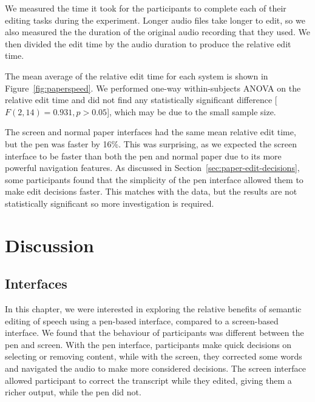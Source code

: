 We measured the time it took for the participants to complete each of their editing tasks during the experiment.
Longer audio files take longer to edit, so we also measured the the duration of the original audio recording that they
used. We then divided the edit time by the audio duration to produce the relative edit time.


The mean average of the relative edit time for each system is shown in Figure~\ref{fig:paperspeed}. We performed
one-way within-subjects ANOVA on the relative edit time and did not find any statistically significant difference
[$F(2,14) = 0.931, p > 0.05$], which may be due to the small sample size.

The screen and normal paper interfaces had the same mean relative edit time, but the pen was faster by 16\%.  This was
surprising, as we expected the screen interface to be faster than both the pen and normal paper due to its more
powerful navigation features. As discussed in Section~\ref{sec:paper-edit-decisions}, some participants found that the
simplicity of the pen interface allowed them to make edit decisions faster. This matches with the data, but the results
are not statistically significant so more investigation is required.

\section{Discussion}\label{sec:paper-discussion}

\subsection{Interfaces}

In this chapter, we were interested in exploring the relative benefits of semantic editing of speech using a pen-based 
interface, compared to a screen-based interface.
We found that the behaviour of participants was different between the pen and screen. With the pen interface,
participants make
quick decisions on selecting or removing content, while with the screen, they corrected some words and navigated the
audio to make more considered decisions. The screen interface allowed participant to correct the transcript while they
edited, giving them a richer output, while the pen did not.

